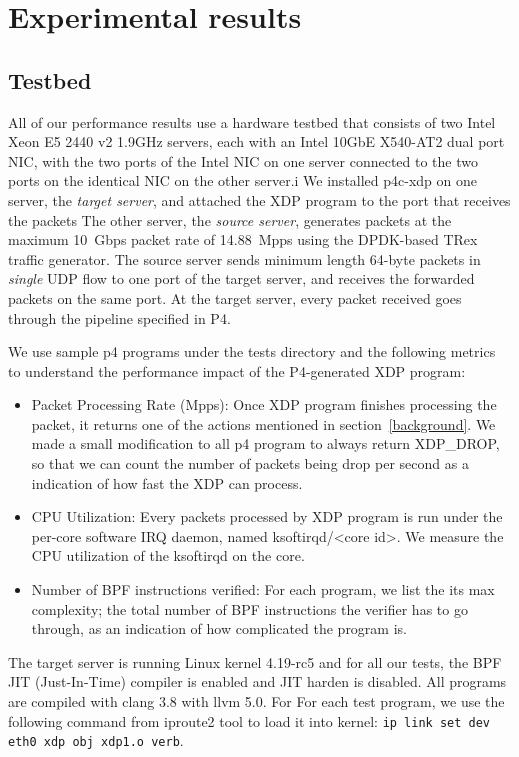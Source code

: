 \section{Experimental results}\label{sec:results}
\subsection{Testbed}
All of our performance results use a hardware testbed that consists of
two Intel Xeon E5 2440 v2 1.9GHz servers, each with an Intel 10GbE X540-AT2 dual
port NIC, with the two ports of the Intel NIC on one server connected
to the two ports on the identical NIC on the other server.i
We installed p4c-xdp on one server, the {\em target server}, and
attached the XDP program to the port that receives the packets
The other server, the {\em source server}, generates packets
at the maximum 10~Gbps packet rate of 14.88~Mpps using the DPDK-based
TRex~\cite{trex} traffic generator.  The source server sends minimum
length 64-byte packets in {\em single} UDP flow to one port of the
target server, and receives the forwarded packets on the same port.
At the target server, every packet received goes through the
pipeline specified in P4.

We use sample p4 programs under the tests directory and the following
metrics to understand the performance impact of the P4-generated XDP
program:
\begin{itemize}
\item Packet Processing Rate (Mpps): Once XDP program finishes processing
the packet, it returns one of the actions mentioned in section~\ref{background}.
We made a small modification to all p4 program to always return XDP\_DROP,
so that we can count the number of packets being drop per second as a
indication of how fast the XDP can process.
\item CPU Utilization: Every packets processed by XDP program is run
under the per-core software IRQ daemon, named ksoftirqd/<core id>.
We measure the CPU utilization of the ksoftirqd on the core.
\item Number of BPF instructions verified: For each program, we list
the its max complexity; the total number of BPF instructions the
verifier has to go through, as an indication of how complicated the
program is.
\end{itemize}

The target server is running Linux kernel 4.19-rc5 and for all our
tests, the BPF JIT (Just-In-Time) compiler is enabled and JIT harden
is disabled. All programs are compiled with clang 3.8 with llvm 5.0.
For For each test program, we use the following
command from iproute2 tool to load it into kernel:
\texttt{ip link set dev eth0 xdp obj xdp1.o verb}.

